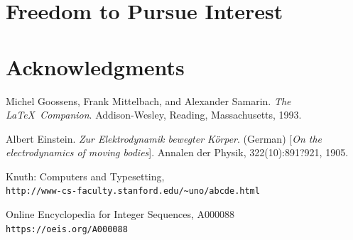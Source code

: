 \documentclass[11pt,a4paper]{report}
\begin{document}
\section{Freedom to Pursue Interest}
\section{Acknowledgments}





\begin{thebibliography}{9}
Michel Goossens, Frank Mittelbach, and Alexander Samarin. 
\textit{The \LaTeX\ Companion}. 
Addison-Wesley, Reading, Massachusetts, 1993.
 
Albert Einstein. 
\textit{Zur Elektrodynamik bewegter K{\"o}rper}. (German) 
[\textit{On the electrodynamics of moving bodies}]. 
Annalen der Physik, 322(10):891?921, 1905.
 
Knuth: Computers and Typesetting,
\\\texttt{http://www-cs-faculty.stanford.edu/\~{}uno/abcde.html}


Online Encyclopedia for Integer Sequences, A000088
\\\texttt{https://oeis.org/A000088}


\end{thebibliography}
 
 
\end{document}
